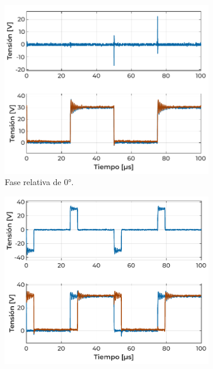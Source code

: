 \begin{figure}[h]
    \centering
    \hspace{0.5em}
    \begin{subfigure}{0.47\textwidth}
        \centering
        \includegraphics[width=\textwidth]{Imagenes/Sin Carga - Fase 0.pdf}
        \caption{Fase relativa de 0°.}
        \label{fig:ensayo_sincarga0}
    \end{subfigure}
    \hspace{0.5em}
    \begin{subfigure}{0.47\textwidth}
        \centering
        \includegraphics[width=\textwidth]{Imagenes/Sin Carga - Fase 30.pdf}

\end{subfigure}
\end{figure}
